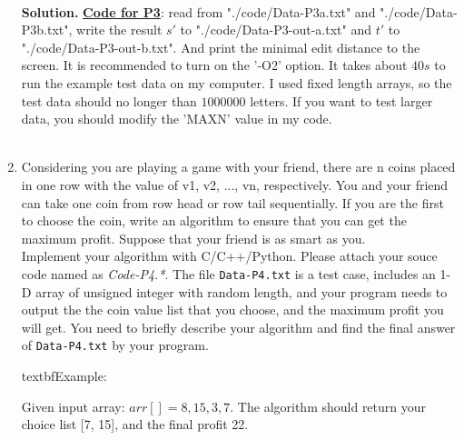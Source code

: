 \documentclass{article}
\newtheorem*{solution}{Solution}
\renewenvironment{solution}[1][Solution]{~\\ \textbf{#1.}}{~\\}
\begin{document}
\begin{enumerate}
\begin{solution}
\href{run:./code/main3.cpp}{\textbf{Code for P3}}: read from "./code/Data-P3a.txt" and "./code/Data-P3b.txt", write the result $s'$ to "./code/Data-P3-out-a.txt" and $t'$ to "./code/Data-P3-out-b.txt". And print the minimal edit distance to the screen. It is recommended to turn on the '-O2' option. It takes about $40s$ to run the example test data on my computer. I used fixed length arrays, so the test data should no longer than $1000000$ letters. If you want to test larger data, you should modify the 'MAXN' value in my code.
\end{solution}
~\\
\item
    Considering you are playing a game with your friend, there are n coins placed in one row with the value of v1, v2, ..., vn, respectively. You and your friend can take one coin from row head or row tail sequentially. If you are the first to choose the coin, write an algorithm to ensure that you can get the maximum profit. Suppose that your friend is as smart as you. 
    ~\\
    Implement your algorithm with C/C++/Python. Please attach your souce code named as {\color{red}\emph{Code-P4.*}}. The file \texttt{Data-P4.txt} is a test case, includes an 1-D array of unsigned integer with random length, and your program needs to output the the coin value list that you choose, and the maximum profit you will get. You need to briefly describe your algorithm and find the final answer of \texttt{Data-P4.txt} by your program.
    
    textbf{Example:}

    Given input array: $arr[]={8, 15, 3, 7}$. The algorithm should return your choice list [7, 15], and the final profit 22. 
    

\end{enumerate}
\end{document}
